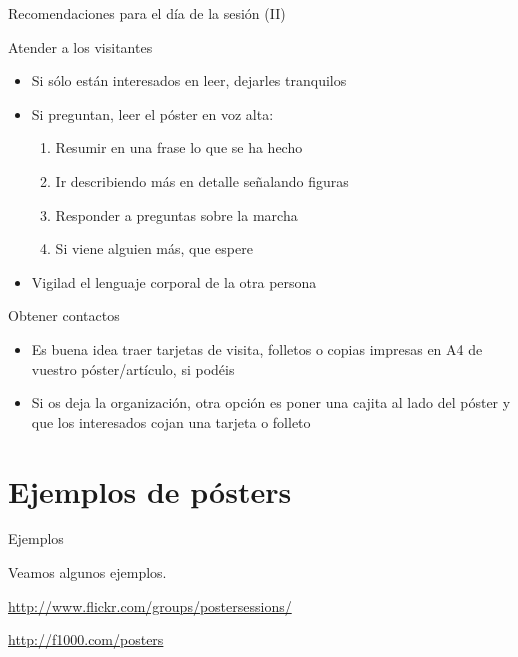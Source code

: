 \documentclass[xcolor=svgnames,compress]{beamer}
\begin{document}
\begin{frame}{Recomendaciones para el día de la sesión (II)}

  \begin{block}{Atender a los visitantes}
    \begin{itemize}
    \item Si sólo están interesados en leer, dejarles tranquilos
    \item Si preguntan,  leer el póster en voz alta:
      \begin{enumerate}
      \item Resumir en una frase lo que se ha hecho
      \item Ir describiendo más en detalle señalando figuras
      \item Responder a preguntas sobre la marcha
      \item Si viene alguien más, que espere
      \end{enumerate}
    \item Vigilad el lenguaje corporal de la otra persona
    \end{itemize}
  \end{block}

  \begin{block}{Obtener contactos}
    \begin{itemize}
    \item Es buena idea traer tarjetas de visita, folletos o copias
      impresas en A4 de vuestro póster/artículo, si podéis
    \item Si os deja la organización, otra opción es poner una cajita
      al lado del póster y que los interesados cojan una tarjeta o
      folleto
    \end{itemize}
  \end{block}

\end{frame}

\section[Ejemplos]{Ejemplos de pósters}
\label{sec:posters}

\begin{frame}{Ejemplos}
  \begin{center}


    {\Large Veamos algunos ejemplos.}


    {\large \url{http://www.flickr.com/groups/postersessions/}}


    {\large \url{http://f1000.com/posters}}
  \end{center}
\end{frame}
\end{document}
